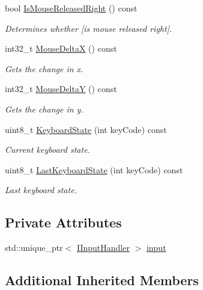 \begin{DoxyCompactItemize}
bool \hyperlink{class_input_manager_ae00dc448b06ad64d49922b1a948acdbe}{Is\+Mouse\+Released\+Right} () const 
\begin{DoxyCompactList}\small\item\em Determines whether \mbox{[}is mouse released right\mbox{]}. \end{DoxyCompactList}\item 
int32\+\_\+t \hyperlink{class_input_manager_af760fc59b17e6fdef177d52abc40c12c}{Mouse\+DeltaX} () const 
\begin{DoxyCompactList}\small\item\em Gets the change in x. \end{DoxyCompactList}\item 
int32\+\_\+t \hyperlink{class_input_manager_ab08ce42932b1f829fcaa89229b5dd15a}{Mouse\+DeltaY} () const 
\begin{DoxyCompactList}\small\item\em Gets the change in y. \end{DoxyCompactList}\item 
uint8\+\_\+t \hyperlink{class_input_manager_a6c0adba353990a1b44ee0d0f4e9a1463}{Keyboard\+State} (int key\+Code) const 
\begin{DoxyCompactList}\small\item\em Current keyboard state. \end{DoxyCompactList}\item 
uint8\+\_\+t \hyperlink{class_input_manager_a6bddc390f0c5cc8a0baba250e5c73fe8}{Last\+Keyboard\+State} (int key\+Code) const 
\begin{DoxyCompactList}\small\item\em Last keyboard state. \end{DoxyCompactList}\end{DoxyCompactItemize}
\subsection*{Private Attributes}
\begin{DoxyCompactItemize}
\item 
std\+::unique\+\_\+ptr$<$ \hyperlink{class_i_input_handler}{I\+Input\+Handler} $>$ \hyperlink{class_input_manager_ab378e443c8fc8c1827ee3fddcc65490c}{input}
\end{DoxyCompactItemize}
\subsection*{Additional Inherited Members}



